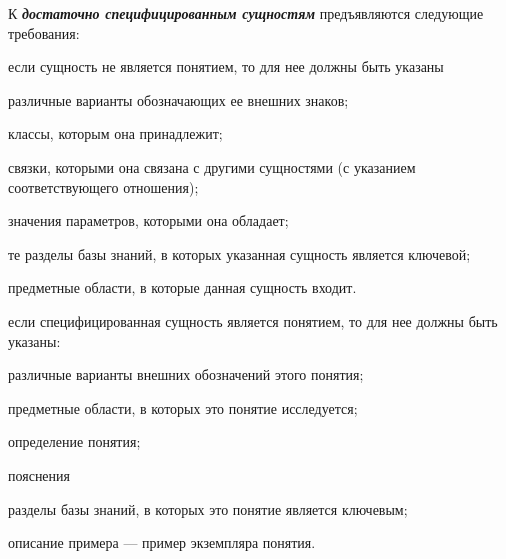 \begin{SCn}
\begin{SCn}
К \textbf{\textit{достаточно специфицированным сущностям}} предъявляются следующие требования:
\begin{textitemize}
\item если сущность не является понятием, то для нее должны быть указаны
\begin{textitemize}
	\item различные варианты обозначающих ее внешних знаков;
	\item классы, которым она принадлежит;
	\item связки, которыми она связана с другими сущностями (с указанием соответствующего отношения);
	\item значения параметров, которыми она обладает;
	\item те разделы базы знаний, в которых указанная сущность является ключевой;
	\item предметные области, в которые данная сущность входит.
\end{textitemize}
\item если специфицированная сущность является понятием, то для нее должны быть указаны:
\begin{textitemize}
	\item различные варианты внешних обозначений этого понятия;
	\item предметные области, в которых это понятие исследуется;
	\item определение понятия;
	\item пояснения
	\item разделы базы знаний, в которых это понятие является ключевым;
	\item описание примера --- пример экземпляра понятия.
\end{textitemize}
\end{textitemize}

\begin{SCn}

\begin{scnsubdividing}
\end{scnsubdividing}
\end{SCn}


\end{SCn}
\end{SCn}
